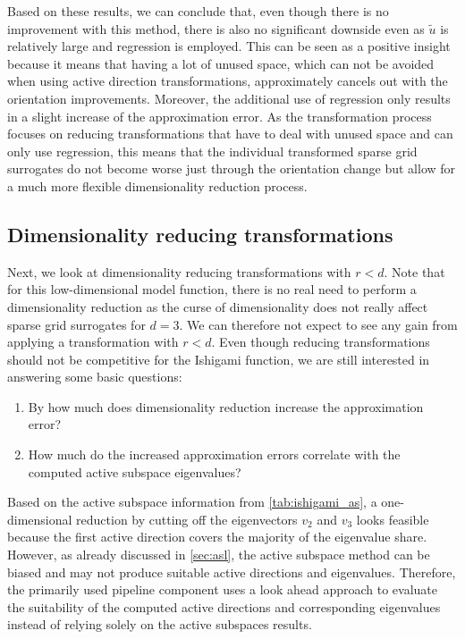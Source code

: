 \documentclass[
  a4paper,  %
  twoside,  %
  bibliography=totoc,
  headsepline,
  cleardoublepage=empty,
  parskip=half,
  draft=false
]{scrbook}
\begin{document}
Based on these results, we can conclude that, even though there is no improvement with this method, there is also no significant downside even as $\tilde{u}$ is relatively large and regression is employed.
This can be seen as a positive insight because it means that having a lot of unused space, which can not be avoided when using active direction transformations, approximately cancels out with the orientation improvements.
Moreover, the additional use of regression only results in a slight increase of the approximation error.
As the transformation process focuses on reducing transformations that have to deal with unused space and can only use regression, this means that the individual transformed sparse grid surrogates do not become worse just through the orientation change but allow for a much more flexible dimensionality reduction process.

\subsection{Dimensionality reducing transformations}

Next, we look at dimensionality reducing transformations with $r < d$.
Note that for this low-dimensional model function, there is no real need to perform a dimensionality reduction as the curse of dimensionality does not really affect sparse grid surrogates for $d=3$.
We can therefore not expect to see any gain from applying a transformation with $r < d$.
Even though reducing transformations should not be competitive for the Ishigami function, we are still interested in answering some basic questions:
\begin{enumerate}
\item By how much does dimensionality reduction increase the approximation error?
\item How much do the increased approximation errors correlate with the computed active subspace eigenvalues?
\end{enumerate}
%
Based on the active subspace information from \cref{tab:ishigami_as}, a one-dimensional reduction by cutting off the eigenvectors $v_2$ and $v_3$ looks feasible because the first active direction covers the majority of the eigenvalue share.
However, as already discussed in \cref{sec:asl}, the active subspace method can be biased and may not produce suitable active directions and eigenvalues.
Therefore, the primarily used pipeline component uses a look ahead approach to evaluate the suitability of the computed active directions and corresponding eigenvalues instead of relying solely on the active subspaces results.
\end{document}

